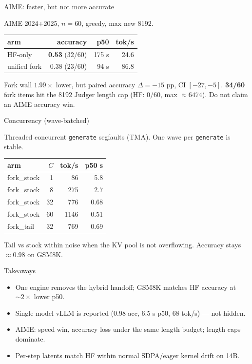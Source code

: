 \documentclass[aspectratio=169]{beamer}
\begin{document}
\begin{frame}{AIME: faster, but not more accurate}

AIME 2024{+}2025, $n{=}60$, greedy, max new 8192.

\begin{center}
\begin{tabular}{lrrr}
\toprule
arm & accuracy & p50 & tok/s \\
\midrule
HF-only & \textbf{0.53} (32/60) & 175 s & 24.6 \\
unified fork & 0.38 (23/60) & 94 s & 86.8 \\
\bottomrule
\end{tabular}
\end{center}

\vspace{0.5em}
Fork wall $1.99\times$ lower, but paired accuracy $\Delta {=} {-15}$ pp, CI $[-27,-5]$.
\textbf{34/60} fork items hit the 8192 Judger length cap (HF: 0/60, max $\approx 6474$).
Do not claim an AIME accuracy win.

\end{frame}

\begin{frame}{Concurrency (wave-batched)}

Threaded concurrent \texttt{generate} segfaults (TMA). One wave per \texttt{generate} is stable.

\begin{center}
\begin{tabular}{lrrr}
\toprule
arm & $C$ & tok/s & p50 s \\
\midrule
fork\_stock & 1 & 86 & 5.8 \\
fork\_stock & 8 & 275 & 2.7 \\
fork\_stock & 32 & 776 & 0.68 \\
fork\_stock & 60 & 1146 & 0.51 \\
fork\_tail & 32 & 769 & 0.69 \\
\bottomrule
\end{tabular}
\end{center}

\vspace{0.5em}
Tail vs stock within noise when the KV pool is not overflowing. Accuracy stays $\approx 0.98$ on GSM8K.

\end{frame}

\begin{frame}{Takeaways}

\begin{itemize}
  \item One engine removes the hybrid handoff; GSM8K matches HF accuracy at $\sim 2\times$ lower p50.
  \item Single-model vLLM is reported (0.98 acc, 6.5 s p50, 68 tok/s) --- not hidden.
  \item AIME: speed win, accuracy loss under the same length budget; length caps dominate.
  \item Per-step latents match HF within normal SDPA/eager kernel drift on 14B.
\end{itemize}

\end{frame}
\end{document}
